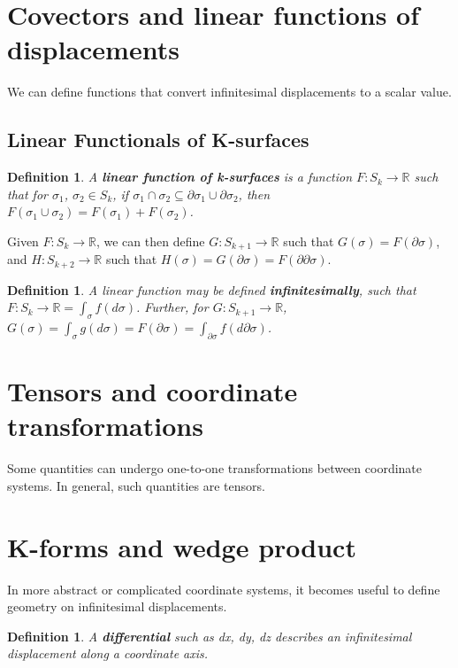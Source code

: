 \documentclass{book}
\newtheorem{defn}[equation]{Definition}
\begin{document}
\section{Covectors and linear functions of displacements}
We can define functions that convert infinitesimal displacements to a scalar value. 

\subsection{Linear Functionals of K-surfaces}


\begin{defn}
	A \textbf{linear function of k-surfaces} is a function $F : S_k \to \mathbb{R}$ such that for $\sigma_1$, $\sigma_2 \in S_k$, if $\sigma_1 \cap \sigma_2 \subseteq \partial\sigma_1 \cup \partial\sigma_2$, then $F(\sigma_1\cup\sigma_2) = F(\sigma_1) + F(\sigma_2)$. 
\end{defn}


Given $F : S_k \to \mathbb{R}$, we can then define $G : S_{k+1} \to \mathbb{R}$ such that $G(\sigma) = F(\partial\sigma)$, and $H : S_{k+2} \to \mathbb{R}$ such that $H(\sigma) = G(\partial\sigma) = F(\partial\partial\sigma)$. 

\begin{defn}
	A linear function may be defined \textbf{infinitesimally}, such that $F : S_k \to \mathbb{R} = \int_{\sigma} f(d\sigma)$. Further, for $G : S_{k+1} \to \mathbb{R}$, $G(\sigma) = \int_{\sigma} g(d\sigma) = F(\partial\sigma) = \int_{\partial\sigma}f(d\partial\sigma)$. 
\end{defn}


\section{Tensors and coordinate transformations}
Some quantities can undergo one-to-one transformations between coordinate systems. In general, such quantities are tensors. 

\section{K-forms and wedge product}
In more abstract or complicated coordinate systems, it becomes useful to define geometry on infinitesimal displacements. 

\begin{defn}
	A \textbf{differential} such as dx, dy, dz describes an infinitesimal displacement along a coordinate axis. 
\end{defn}
\end{document}
